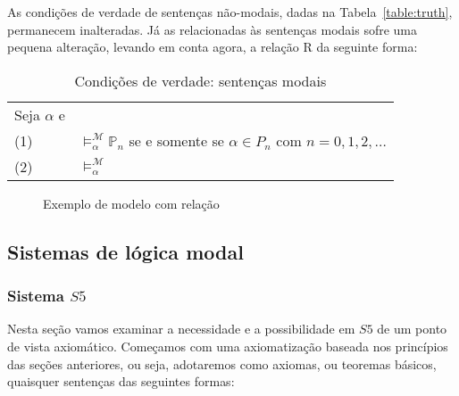 As condições de verdade de sentenças não-modais, dadas na
Tabela~\ref{table:truth}, permanecem inalteradas. Já as relacionadas às
sentenças modais sofre uma pequena alteração, levando em conta agora, a relação
R da seguinte forma:

    \begin{table}[h!]
\label{table:truth2}
\begin{center}
    \caption{Condições de verdade: sentenças modais}
    \begin{tabular}{ll}
    Seja $\alpha$ e  \\

        \vspace{2mm}
        (1) & $\models ^{\mathcal{M}}_{\alpha} \mathbb{P}_n$ se e somente se $\alpha \in
        P_n$ com $n=0,1,2,\ldots$\\
        (2)  & $\models ^{\mathcal{M}}_{\alpha} $\\

    \end{tabular}
\end{center}
\end{table}

\begin{figure}
\begin{center}
\label{figure:mundos_relacao}
\caption{Exemplo de modelo com relação}
\end{center}
\end{figure}


\subsection{Sistemas de lógica modal}
\label{sec:sistemas}

\subsubsection{Sistema $S5$}

Nesta seção vamos examinar a necessidade e a possibilidade em $S5$ de um ponto
de vista axiomático. Começamos com uma axiomatização baseada nos princípios das
seções anteriores, ou seja, adotaremos como axiomas, ou teoremas básicos,
quaisquer sentenças das seguintes formas:

